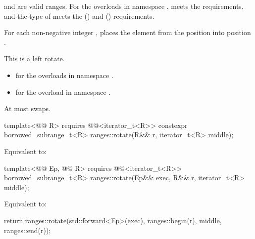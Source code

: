 \begin{itemdescr}
\pnum
\expects
{} and  are valid ranges.
For the overloads in namespace ,
 meets
the  requirements, and
the type of  meets
the  () and
 () requirements.

\pnum
\effects
For each non-negative integer ,
places the element from the position 
into position .
\begin{note}
This is a left rotate.
\end{note}

\pnum
\returns
\begin{itemize}
\item
  for the overloads in namespace .
\item
  for the overload in namespace .
\end{itemize}

\pnum
\complexity
At most  swaps.
\end{itemdescr}

\begin{itemdecl}
template<@@ R>
  requires @@<iterator_t<R>>
  constexpr borrowed_subrange_t<R> ranges::rotate(R&& r, iterator_t<R> middle);
\end{itemdecl}

\begin{itemdescr}
\pnum
\effects
Equivalent to:
\end{itemdescr}

\begin{itemdecl}
template<@@ Ep, @@ R>
  requires @@<iterator_t<R>>
  borrowed_subrange_t<R> ranges::rotate(Ep&& exec, R&& r, iterator_t<R> middle);
\end{itemdecl}

\begin{itemdescr}
\pnum
\effects
Equivalent to:
\begin{codeblock}
return ranges::rotate(std::forward<Ep>(exec), ranges::begin(r), middle, ranges::end(r));
\end{codeblock}
\end{itemdescr}

